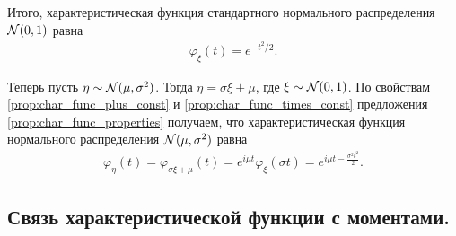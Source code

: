 \documentclass[../main.tex]{subfiles}
\begin{document}
\begin{exmpl}
 Итого, характеристическая функция стандартного нормального распределения $ \mathcal N(0,1) $ равна
 \begin{align*}
  \varphi_\xi(t) = e^{-t^{2} / 2}.
 \end{align*}

 Теперь пусть $ \eta \sim \mathcal N(\mu, \sigma^{2}) $. Тогда $ \eta = \sigma \xi + \mu $, где $ \xi \sim \mathcal N(0,1) $. По свойствам \ref{prop:char_func_plus_const} и \ref{prop:char_func_times_const} предложения \ref{prop:char_func_properties} получаем, что характеристическая функция нормального распределения $ \mathcal N(\mu,\sigma^{2}) $ равна
 \begin{align*}
  \varphi_\eta(t) = \varphi_{\sigma \xi + \mu}(t) = e^{i \mu t} \varphi_\xi(\sigma t) = e^{i \mu t - \frac{\sigma^{2}t^{2}}{2}}.
 \end{align*}
\end{exmpl}

\subsection{Связь характеристической функции с моментами.}
\end{document}
